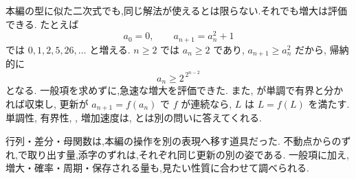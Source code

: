 本編の型に似た二次式でも,同じ解法が使えるとは限らない.それでも増大は評価できる.
たとえば
\[
  a_0=0,\qquad a_{n+1}=a_n^2+1
\]
では $0,1,2,5,26,\ldots$ と増える.
$n\ge2$ では $a_n\ge2$ であり, $a_{n+1}\ge a_n^2$ だから, 帰納的に
\[
  a_n\ge 2^{\,2^{n-2}}
\]
となる.
一般項を求めずに,急速な増大を評価できた.
また, が単調で有界と分かれば収束し, 更新が $a_{n+1}=f(a_n)$ で $f$ が連続なら,  $L$ は $L=f(L)$ を満たす.
単調性, 有界性, , 増加速度は, とは別の問いに答えてくれる.

行列・差分・母関数は,本編の操作を別の表現へ移す道具だった.
不動点からのずれ,で取り出す量,添字のずれは,それぞれ同じ更新の別の姿である.
一般項に加え,増大・確率・周期・保存される量も,見たい性質に合わせて調べられる.
